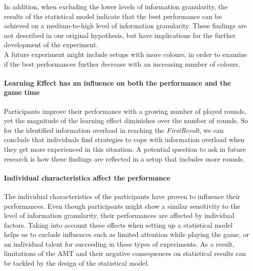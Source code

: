 In addition, when excluding the lower levels of information granularity, the results of the statistical model indicate that the best performance can be achieved on a medium-to-high level of information granularity. These findings are not described in our original hypothesis, but have implications for the further development of the experiment.\\
A future experiment might include setups with more colours, in order to examine if the best performances further decrease with an increasing number of colours. 

\paragraph{Learning Effect has an influence on both the performance and the game time} 

Participants improve their performance with a growing number of played rounds, yet the magnitude of the learning effect diminishes over the number of rounds. So for the identified information overload in reaching the \textit{FirstResult}, we can conclude that individuals find strategies to cope with information overload when they get more experienced in this situation. A potential question to ask in future research is how these findings are reflected in a setup that includes more rounds.

\paragraph{Individual characteristics affect the performance}
The individual characteristics of the  participants have proven to influence their performances. Even though participants might show a similar sensitivity to the level of information granularity, their performances are affected by individual factors. Taking into account these effects when setting up a statistical model helps us to exclude influences such as limited attention while playing the game, or an individual talent for succeeding in these types of experiments. As a result, limitations of the \acl{AMT} and their negative consequences on statistical results can be tackled by the design of the statistical model.

